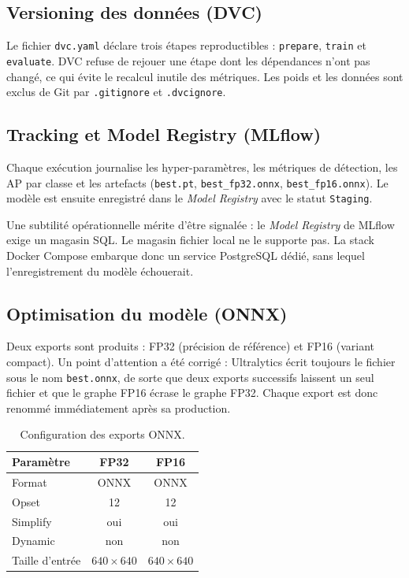 \documentclass[11pt,a4paper]{article}
\begin{document}
\subsection{Versioning des données (DVC)}

Le fichier \texttt{dvc.yaml} déclare trois étapes reproductibles :
\texttt{prepare}, \texttt{train} et \texttt{evaluate}. DVC refuse de
rejouer une étape dont les dépendances n'ont pas changé, ce qui évite le
recalcul inutile des métriques. Les poids et les données sont exclus de Git
par \texttt{.gitignore} et \texttt{.dvcignore}.

\subsection{Tracking et Model Registry (MLflow)}

Chaque exécution journalise les hyper-paramètres, les métriques de
détection, les AP par classe et les artefacts (\texttt{best.pt},
\texttt{best\_fp32.onnx}, \texttt{best\_fp16.onnx}). Le modèle est ensuite
enregistré dans le \emph{Model Registry} avec le statut \texttt{Staging}.

Une subtilité opérationnelle mérite d'être signalée : le \emph{Model
Registry} de MLflow exige un magasin SQL. Le magasin fichier local ne le
supporte pas. La stack Docker Compose embarque donc un service PostgreSQL
dédié, sans lequel l'enregistrement du modèle échouerait.

\subsection{Optimisation du modèle (ONNX)}

Deux exports sont produits : FP32 (précision de référence) et FP16
(variant compact). Un point d'attention a été corrigé : Ultralytics écrit
toujours le fichier sous le nom \texttt{best.onnx}, de sorte que deux
exports successifs laissent un seul fichier et que le graphe FP16 écrase
le graphe FP32. Chaque export est donc renommé immédiatement après sa
production.

\begin{table}[H]
\centering
\caption{Configuration des exports ONNX.}
\begin{tabular}{@{}lcc@{}}
\toprule
\textbf{Paramètre} & \textbf{FP32} & \textbf{FP16} \\
\midrule
Format        & ONNX & ONNX \\
Opset         & 12   & 12 \\
Simplify      & oui  & oui \\
Dynamic       & non  & non \\
Taille d'entrée & \(640 \times 640\) & \(640 \times 640\) \\
\bottomrule
\end{tabular}
\end{table}
\end{document}
